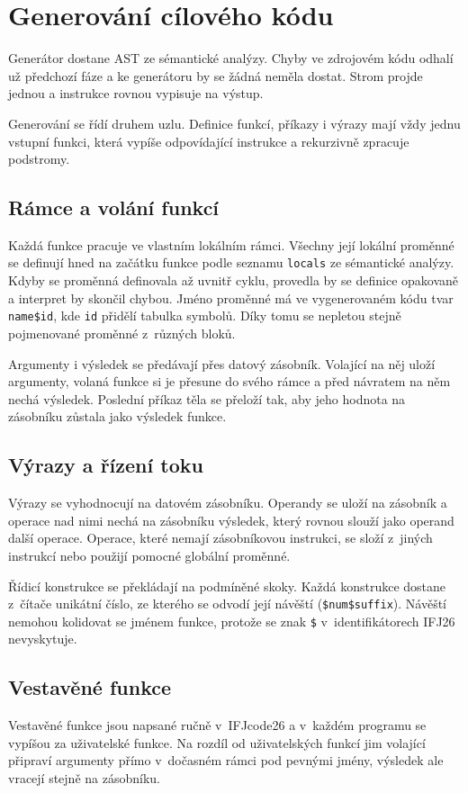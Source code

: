 \section{Generování cílového kódu}\label{sec:codegen}
Generátor dostane AST ze sémantické analýzy. Chyby ve zdrojovém kódu
odhalí už předchozí fáze a ke generátoru by se žádná neměla dostat.
Strom projde jednou a instrukce rovnou vypisuje na výstup.

Generování se řídí druhem uzlu. Definice funkcí, příkazy i výrazy mají
vždy jednu vstupní funkci, která vypíše odpovídající instrukce
a rekurzivně zpracuje podstromy.

\subsection{Rámce a volání funkcí}
Každá funkce pracuje ve vlastním lokálním rámci. Všechny její lokální
proměnné se definují hned na začátku funkce podle seznamu \texttt{locals}
ze sémantické analýzy. Kdyby se proměnná definovala až uvnitř cyklu,
provedla by se definice opakovaně a interpret by skončil chybou. Jméno
proměnné má ve vygenerovaném kódu tvar \texttt{name\$id}, kde \texttt{id}
přidělí tabulka symbolů. Díky tomu se nepletou stejně pojmenované proměnné
z~různých bloků.

Argumenty i výsledek se předávají přes datový zásobník. Volající na něj
uloží argumenty, volaná funkce si je přesune do svého rámce a před
návratem na něm nechá výsledek. Poslední příkaz těla se přeloží tak, aby
jeho hodnota na zásobníku zůstala jako výsledek funkce.

\subsection{Výrazy a řízení toku}
Výrazy se vyhodnocují na datovém zásobníku. Operandy se uloží na zásobník
a operace nad nimi nechá na zásobníku výsledek, který rovnou slouží jako
operand další operace. Operace, které nemají zásobníkovou instrukci, se
složí z~jiných instrukcí nebo použijí pomocné globální proměnné.

Řídicí konstrukce se překládají na podmíněné skoky. Každá konstrukce
dostane z~čítače unikátní číslo, ze kterého se odvodí její návěští
(\texttt{\$num\$suffix}). Návěští nemohou kolidovat se jménem funkce,
protože se znak \texttt{\$} v~identifikátorech IFJ26 nevyskytuje.

\subsection{Vestavěné funkce}
Vestavěné funkce jsou napsané ručně v~IFJcode26 a v~každém programu se
vypíšou za uživatelské funkce. Na rozdíl od uživatelských funkcí jim
volající připraví argumenty přímo v~dočasném rámci pod pevnými jmény,
výsledek ale vracejí stejně na zásobníku.


